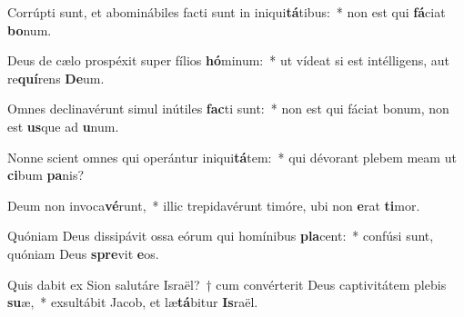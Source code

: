 \item Corrúpti sunt, et abominábiles facti sunt in iniqui\textbf{tá}tibus:~* non est qui \textbf{fá}ciat \textbf{bo}num.
\item Deus de cælo prospéxit super fílios \textbf{hó}minum:~* ut vídeat si est intélligens, aut re\textbf{quí}rens \textbf{De}um.
\item Omnes declinavérunt simul inútiles \textbf{fac}ti sunt:~* non est qui fáciat bonum, non est \textbf{us}que ad \textbf{u}num.
\item Nonne scient omnes qui operántur iniqui\textbf{tá}tem:~* qui dévorant plebem meam ut \textbf{ci}bum \textbf{pa}nis?
\item Deum non invoca\textbf{vé}runt,~* illic trepidavérunt timóre, ubi non \textbf{e}rat \textbf{ti}mor.
\item Quóniam Deus dissipávit ossa eórum qui homínibus \textbf{pla}cent:~* confúsi sunt, quóniam Deus \textbf{spre}vit \textbf{e}os.
\item Quis dabit ex Sion salutáre Israël?~† cum convérterit Deus captivitátem plebis \textbf{su}æ,~* exsultábit Jacob, et læ\textbf{tá}bitur \textbf{Is}raël.
